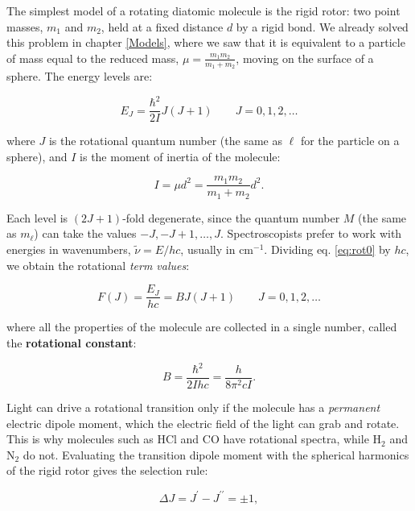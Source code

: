 \documentclass[
  english,
  9pt,
]{extbook}
\theoremstyle{definition}
\theoremstyle{definition}
\theoremstyle{definition}
\theoremstyle{definition}
\theoremstyle{remark}
\begin{document}
The simplest model of a rotating diatomic molecule is the rigid rotor: two point masses, \(m_1\) and \(m_2\), held at a fixed distance \(d\) by a rigid bond. We already solved this problem in chapter \ref{Models}, where we saw that it is equivalent to a particle of mass equal to the reduced mass, \(\mu=\frac{m_1m_2}{m_1+m_2}\), moving on the surface of a sphere. The energy levels are:

\begin{equation}
E_J = \frac{\hbar^2}{2I}J(J+1) \qquad J=0,1,2,\ldots
\label{eq:rot0}
\end{equation}

where \(J\) is the rotational quantum number (the same as \(\ell\) for the particle on a sphere), and \(I\) is the moment of inertia of the molecule:

\begin{equation}
 I=\mu d^2=\frac{m_1m_2}{m_1 +m_2}d^2.
 \label{eq:rot3}
\end{equation}

Each level is \((2J+1)\)-fold degenerate, since the quantum number \(M\) (the same as \(m_\ell\)) can take the values \(-J, -J+1, \ldots, J\). Spectroscopists prefer to work with energies in wavenumbers, \(\tilde{\nu}=E/hc\), usually in \(\text{cm}^{-1}\). Dividing eq. \eqref{eq:rot0} by \(hc\), we obtain the rotational \emph{term values}:

\begin{equation}
F\left(J\right)=\frac{E_J}{hc}=BJ\left(J+1\right)\qquad J=0,1,2,\ldots
\label{eq:rot1}
\end{equation}

where all the properties of the molecule are collected in a single number, called the \textbf{rotational constant}:

\begin{equation}
B=\frac{\hbar^2}{2Ihc}={\frac{h}{8\pi ^{2}cI}}.
\label{eq:rot2}
\end{equation}

Light can drive a rotational transition only if the molecule has a \emph{permanent} electric dipole moment, which the electric field of the light can grab and rotate. This is why molecules such as \(\mathrm{HCl}\) and \(\mathrm{CO}\) have rotational spectra, while \(\mathrm{H}_2\) and \(\mathrm{N}_2\) do not. Evaluating the transition dipole moment with the spherical harmonics of the rigid rotor gives the selection rule:

\begin{equation}
 \Delta J = J^{{\prime }} - J^{{\prime \prime }} = \pm 1,
 \label{eq:rot4}
\end{equation}
\end{document}
